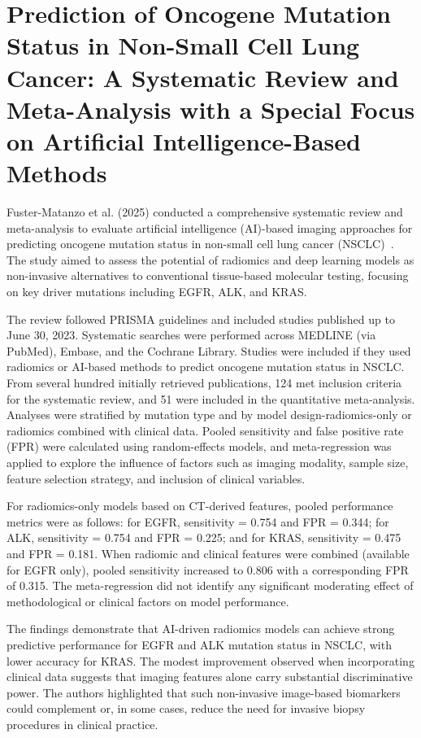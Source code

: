 \section{Prediction of Oncogene Mutation Status in Non-Small Cell Lung Cancer: A Systematic Review and Meta-Analysis with a Special Focus on Artificial Intelligence-Based Methods}

Fuster-Matanzo et al. (2025) conducted a comprehensive systematic review and meta-analysis to evaluate artificial intelligence (AI)-based imaging approaches for predicting oncogene mutation status in non-small cell lung cancer (NSCLC)~\cite{Fuster-Matanzo2025-ki}. The study aimed to assess the potential of radiomics and deep learning models as non-invasive alternatives to conventional tissue-based molecular testing, focusing on key driver mutations including EGFR, ALK, and KRAS. 

The review followed PRISMA guidelines and included studies published up to June 30, 2023. Systematic searches were performed across MEDLINE (via PubMed), Embase, and the Cochrane Library. Studies were included if they used radiomics or AI-based methods to predict oncogene mutation status in NSCLC. From several hundred initially retrieved publications, 124 met inclusion criteria for the systematic review, and 51 were included in the quantitative meta-analysis. Analyses were stratified by mutation type and by model design-radiomics-only or radiomics combined with clinical data. Pooled sensitivity and false positive rate (FPR) were calculated using random-effects models, and meta-regression was applied to explore the influence of factors such as imaging modality, sample size, feature selection strategy, and inclusion of clinical variables.

For radiomics-only models based on CT-derived features, pooled performance metrics were as follows: for EGFR, sensitivity = 0.754 and FPR = 0.344; for ALK, sensitivity = 0.754 and FPR = 0.225; and for KRAS, sensitivity = 0.475 and FPR = 0.181. When radiomic and clinical features were combined (available for EGFR only), pooled sensitivity increased to 0.806 with a corresponding FPR of 0.315. The meta-regression did not identify any significant moderating effect of methodological or clinical factors on model performance.

The findings demonstrate that AI-driven radiomics models can achieve strong predictive performance for EGFR and ALK mutation status in NSCLC, with lower accuracy for KRAS. The modest improvement observed when incorporating clinical data suggests that imaging features alone carry substantial discriminative power. The authors highlighted that such non-invasive image-based biomarkers could complement or, in some cases, reduce the need for invasive biopsy procedures in clinical practice.

